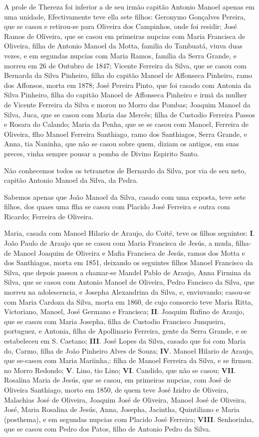 A prole de Thereza foi inferior a de seu irmão capitão Antonio Manoel apenas em uma unidade, Efectivamente teve ella sete filhos: Geronymo Gonçalves Pereira, que se casou e retirou-se para Oliveira dos Campinhos, onde foi residir; José Ramos de Oliveira, que se casou em primeiras nupcias com Maria Francisca de Oliveira, filha de Antonio Manoel da Motta, familia do Tambuatá, viuva duas vezes, e em segundas nupcias com Maria Ramos, família da Serra Grande, e morreu em 26 de Outubro de 1847; Vicente Ferreira da Silva, que se casou com Bernarda da Silva Pinheiro, filha do capitão Manoel de Affonseca Pinheiro, ramo dos Affonsos, morta em 1878; José Pereira Pinto, que foi casado com Antonia da Silva Pinheiro, filha do capitão Manoel de Affonseca Pinheiro e irmã da mulher de Vicente Ferreira da Silva e morou no Morro das Pombas; Joaquim Manoel da Silva, Juca, que se casou com Maria das Mercês; filha de Custodio Ferreira Passos e Rosara do Calando; Maria da Penha, que se se casou com Manoel, Ferreira de Oliveira, flho Manoel Ferreira Santhiago, ramo dos Santhiagos, Serra Grande, e Anna, tia Naninha, que não se casou sobre quem, diziam os antigos, em suas preces, vinha sempre pousar a pomba de Divino Espirito Santo.

Não conhecemos todos os tetranetos de Bernardo da Silva, por via de seu neto, capitão Antonio Manoel da Silva, da Pedra.

Sabemos apenas que João Manoel da Silva, casado com uma exposta, teve sete filhos, dos quaes uma flha se casou com Placido José Ferreira e outra com Ricardo; Ferreira de Oliveira.

Maria, casada com Manoel Hilario de Araujo, do Coité, teve os filhos seguintes: \textbf{I}. João Paulo de Araujo que se casou com Maria Francisca de Jesús, a muda, filha-de Manoel Joaquim de Oliveira e Mafia Francisca de Jesús, ramos dos Motta e dos Santhiagos, morta em 1851, deixando os seguintes filhos Manoel Francisco da Silva, que depois passou a chamar-se Mandel Pablo de Araujo, Anna Firmina da Silva, que se casou com Antonio Manoel de Oliveira, Pedro Fancisco da Silva, que morreu na adolescencia, e Josepha Alexandrina da Silva, e, enviuvando; casou-se com Maria Cardoza da Silva, morta em 1860, de cujo consorcio teve Maria Ritta, Victoriano, Manoel, José Germano e Francisca; \textbf{II}. Joaquim Rufino de Araujo, que se casou com Maria Josepha, filha de Custodio Francisco Junqueira, portuguez, e Antonia, filha de Apollinario Ferreira, gente da Serra Grande, e se estabeleceu em S. Caetano; \textbf{III}. José Lopes da Silva, casado que foi com Maria do, Carmo, filha de João Pinheiro Alves de Souza; \textbf{IV}. Manoel Hilario de Araujo, que se-casou com Maria Mariinha,: filha de Manoel Ferreira da Silva, e se firmou. no Morro Redondo; \textbf{V}. Lino, tio Lino; \textbf{VI}. Candido, que não se casou; \textbf{VII}. Rosalina Maria de Jesús, que se casou, em primeiras nupcias, com José de Oliveira Santhiago, morto em 1850, de quem teve José Izidro de Oliveira, Malachias José de Oliveira, Joaquim José de Oliveira, Manoel José de Oliveira, José, Maria Rosalina de Jesús, Anna, Josepha, Jacintha, Quintiliano e Maria (posthema), e em segundas nupcias com Placido José Ferreira; \textbf{VIII}. Senhorinha, que se casou com Pedro dos Patos, filho de Antonio Pedro da Silva.


